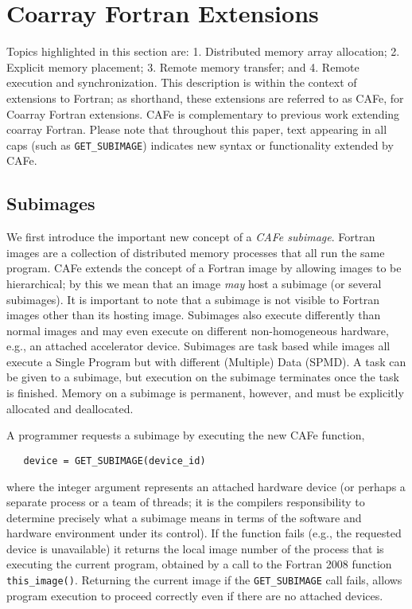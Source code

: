 \section{Coarray Fortran Extensions}

Topics highlighted in this section are: 1. Distributed memory array allocation;
2. Explicit memory placement; 3. Remote memory transfer; and 4. Remote execution
and synchronization.  This
description is within the context of extensions to Fortran; as shorthand, these extensions
are referred to as CAFe, for Coarray Fortran extensions.  CAFe is complementary to
previous work extending coarray Fortran\cite{mellor-crummey:2009:caf2,jin:2011:caf2}.
Please note that throughout this paper, text appearing in all caps (such as
\texttt{GET\_SUBIMAGE}) indicates new syntax or functionality extended by CAFe.



\subsection{Subimages}

We first introduce the important new concept of a \emph{CAFe subimage}.  Fortran images
are a collection of distributed memory processes that all run the same program.  CAFe
extends the concept of a Fortran image by allowing images to be hierarchical; by this we
mean that an image \emph{may} host a subimage (or several subimages).  It is important to
note that a subimage is not visible to Fortran images other than its hosting image.
Subimages also execute differently than normal images and may even execute on different
non-homogeneous hardware, e.g., an attached accelerator device.  Subimages are task based
while images all execute a Single Program but with different (Multiple) Data (SPMD).  A
task can be given to a subimage, but execution on the subimage terminates once the task is
finished.  Memory on a subimage is permanent, however, and must be explicitly allocated
and deallocated.

A programmer requests a subimage by executing the new CAFe function,

\begin{verbatim}
   device = GET_SUBIMAGE(device_id)
\end{verbatim}

\noindent where the integer argument represents an attached hardware device (or perhaps a separate
process or a team of threads; it is the compilers responsibility to determine precisely
what a subimage means in terms of the software and hardware environment under its
control).  If the function fails (e.g., the requested device is unavailable) it returns
the local image number of the process that is executing the current program, obtained by a
call to the Fortran 2008 function \texttt{this\_image()}.  Returning the current image if
the \texttt{GET\_SUBIMAGE} call fails, allows program execution to proceed correctly even if
there are no attached devices.

